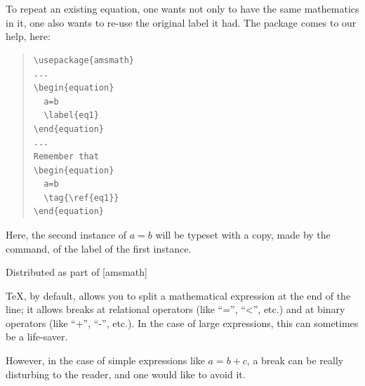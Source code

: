
To repeat an existing equation, one wants not only to have the same
mathematics in it, one also wants to re-use the original label it had.
The  package comes to our help, here:
\begin{quote}
\begin{verbatim}
\usepackage{amsmath}
...
\begin{equation}
  a=b
  \label{eq1}
\end{equation}
...
Remember that
\begin{equation}
  a=b
  \tag{\ref{eq1}}
\end{equation}
\end{verbatim}
\end{quote}
Here, the second instance of \ensuremath{a=b} will be
typeset with a copy, made by the  command, of the label of the
first instance.
\begin{ctanrefs}
\item[amsmath.sty]Distributed as part of \AMSLaTeX{}
  [amsmath]
\end{ctanrefs}


\TeX{}, by default, allows you to split a mathematical expression at
the end of the line; it allows breaks at relational operators (like
``='', ``\textless'', etc.) and at binary operators (like ``+'',
``-'', etc.).  In the case of large expressions, this can sometimes be
a life-saver.

However, in the case of simple expressions like \ensuremath{a=b+c}, a
break can be really disturbing to the reader, and one would like to
avoid it.

